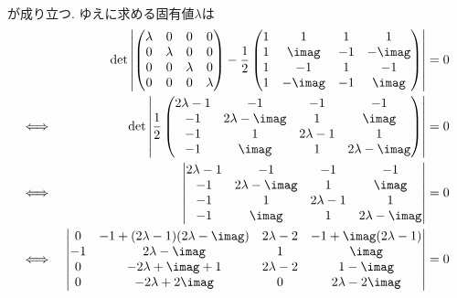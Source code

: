 \documentclass[dvipdfmx,titlepage, 11pt, a4paper]{jsarticle}%
\begin{document}
\begin{enumerate}[(1)]
\begin{eqnarray*}
    \end{eqnarray*}
    が成り立つ. ゆえに求める固有値$\lambda$は
    \begin{eqnarray*}
        && \mathrm{det}\left\lvert
        \begin{pmatrix}
            \lambda & 0 & 0 & 0\\
            0 & \lambda & 0 & 0\\
            0 & 0 & \lambda & 0\\
            0 & 0 & 0 & \lambda 
        \end{pmatrix}
        -\frac{1}{2}
        \begin{pmatrix}
            1 & 1 & 1 & 1\\
            1 & \imag & -1 & -\imag\\
            1 & -1 & 1 & -1\\
            1 & -\imag & -1 & \imag
        \end{pmatrix}
        \right\rvert = 0\\
        \Longleftrightarrow\ && \mathrm{det}\left\lvert
        \frac{1}{2}
        \begin{pmatrix}
            2\lambda - 1 & -1 & -1 & -1\\
            -1 & 2\lambda - \imag & 1 & \imag\\
            -1 & 1 & 2\lambda - 1 & 1\\
            -1 & \imag & 1 & 2\lambda - \imag
        \end{pmatrix}\right\rvert = 0\\
        \Longleftrightarrow\ && 
        \begin{vmatrix}
            2\lambda - 1 & -1 & -1 & -1\\
            -1 & 2\lambda - \imag & 1 & \imag\\
            -1 & 1 & 2\lambda - 1 & 1\\
            -1 & \imag & 1 & 2\lambda - \imag
        \end{vmatrix} = 0\\
        \Longleftrightarrow\ && 
        \begin{vmatrix}
            0 & -1 + (2\lambda - 1)(2\lambda - \imag) & 2\lambda - 2 & -1 + \imag(2\lambda - 1)\\
            -1 & 2\lambda - \imag & 1 & \imag\\
            0 & -2\lambda + \imag + 1 & 2\lambda - 2 & 1 - \imag\\
            0 & -2\lambda + 2\imag & 0 & 2\lambda - 2\imag
        \end{vmatrix} = 0\\

\end{eqnarray*}
\end{enumerate}
\end{document}
